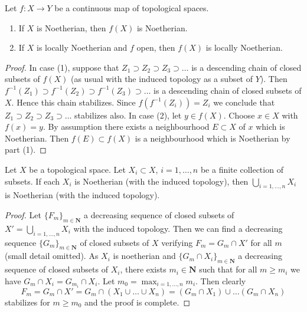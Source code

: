 \begin{lemma}
\label{lemma-image-Noetherian}
Let $f : X \to Y$ be a continuous map of topological spaces.
\begin{enumerate}
\item If $X$ is Noetherian, then $f(X)$ is Noetherian.
\item If $X$ is locally Noetherian and $f$ open, then $f(X)$ is
locally Noetherian.
\end{enumerate}
\end{lemma}

\begin{proof}
In case (1), suppose that $Z_1 \supset Z_2 \supset Z_3 \supset \ldots$
is a descending chain of closed subsets of $f(X)$ (as usual with the induced
topology as a subset of $Y$). Then
$f^{-1}(Z_1) \supset f^{-1}(Z_2) \supset f^{-1}(Z_3) \supset \ldots$ is
a descending chain of closed subsets of $X$. Hence this chain stabilizes.
Since $f(f^{-1}(Z_i)) = Z_i$ we conclude that
$Z_1 \supset Z_2 \supset Z_3 \supset \ldots$
stabilizes also. In case (2), let $y \in f(X)$. Choose $x \in X$ with
$f(x) = y$. By assumption there exists a neighbourhood $E \subset X$ of
$x$ which is Noetherian. Then $f(E) \subset f(X)$ is a neighbourhood
which is Noetherian by part (1).
\end{proof}

\begin{lemma}
\label{lemma-finite-union-Noetherian}
Let $X$ be a topological space.
Let $X_i \subset X$, $i = 1, \ldots, n$ be a finite collection of subsets.
If each $X_i$ is Noetherian (with the induced topology), then
$\bigcup_{i = 1, \ldots, n}  X_i$ is Noetherian (with the induced topology).
\end{lemma}

\begin{proof}
Let $\{F_m\}_{m \in \mathbf{N}}$ a decreasing sequence of closed subsets
of $X' = \bigcup_{i = 1, \ldots, n}  X_i$ with the induced topology.
Then we can find a decreasing sequence $\{G_m\}_{m \in \mathbf{N}}$
of closed subsets of $X$ verifying $F_m = G_m \cap X'$ for all $m$
(small detail omitted). As $X_i$ is noetherian and
$\{G_m \cap X_i\}_{m \in \mathbf{N}}$ a decreasing sequence
of closed subsets of $X_i$, there exists $m_i \in \mathbf{N}$
such that for all $m \geq m_i$ we have $G_m \cap X_i = G_{m_i} \cap X_i$.
Let $m_0 = \max_{i = 1, \ldots, n} m_i$. Then clearly
$$
F_m = G_m \cap X' = G_m \cap (X_1 \cup \ldots \cup X_n) =
(G_m \cap X_1) \cup \ldots (G_m \cap X_n)
$$
stabilizes for $m \geq m_0$ and the proof is complete.
\end{proof}

